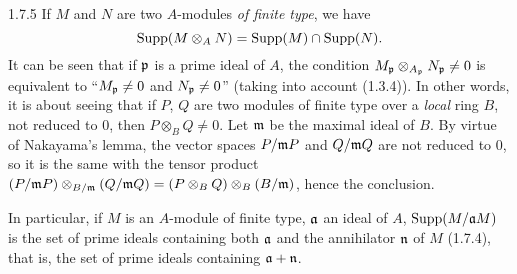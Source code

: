 \documentclass[../main.tex]{subfiles}
\begin{document}
\begin{cx}{1.7.5}
If $M$ and $N$ are two $A$-modules \emph{of finite type}, we have
\[
  \operatorname*{Supp}(M\otimes_A N)=\operatorname*{Supp}(M)\cap\operatorname*{Supp}(N).
\]
It can be seen that if $\mathfrak{p}$ is a prime ideal of $A$, the condition
$M_\mathfrak{p}\otimes_{A_\mathfrak{p}}N_\mathfrak{p}\neq 0$ is equivalent to
``$M_\mathfrak{p}\neq 0$ and $N_\mathfrak{p}\neq 0$'' (taking into account (1.3.4)). In
other words, it is about seeing that if $P$, $Q$ are two modules of finite type
over a \emph{local} ring $B$, not reduced to $0$, then $P\otimes_B Q\neq 0$. Let
$\mathfrak{m}$ be the maximal ideal of $B$. By virtue of Nakayama's lemma, the vector
spaces $P/\mathfrak{m}P$ and $Q/\mathfrak{m}Q$ are not reduced to $0$, so it is the same with
the tensor product
$(P/\mathfrak{m}P)\otimes_{B/\mathfrak{m}}(Q/\mathfrak{m}Q)=(P\otimes_B Q)\otimes_B(B/\mathfrak{m})$,
hence the conclusion.

In particular, if $M$ is an $A$-module of finite type, $\mathfrak{a}$ an ideal of $A$,
$\operatorname*{Supp}(M/\mathfrak{a}M)$ is the set of prime ideals containing both $\mathfrak{a}$ and the
annihilator $\mathfrak{n}$ of $M$ (1.7.4), that is, the set of prime ideals containing
$\mathfrak{a}+\mathfrak{n}$.
\end{cx}
\end{document}
